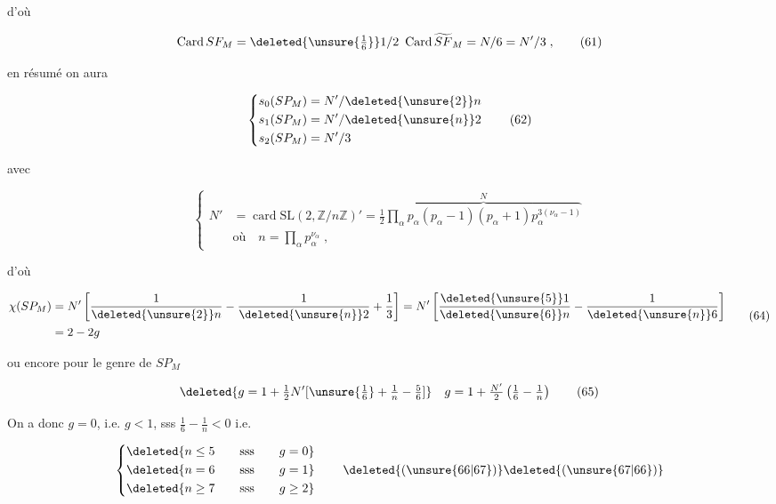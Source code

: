 d'où

\[
\operatorname{Card}SF_M=\deleted{\unsure{\tfrac16}}1/2\ \operatorname{Card}\widetilde{SF}_M=N/6=N'/3\;,\tag*{(61)}
\]

en résumé on aura

\[
\left\{\begin{aligned}
s_0(SP_M)&=N'/\deleted{\unsure{2}}n\\
s_1(SP_M)&=N'/\deleted{\unsure{n}}2\\
s_2(SP_M)&=N'/3
\end{aligned}\right.\tag*{(62)}
\]


avec

\[
\left\{\begin{aligned}
N'&=\operatorname{card}\mathrm{SL}(2,\mathbb{Z}/n\mathbb{Z})'=\tfrac12\overbrace{\prod_\alpha p_\alpha(p_\alpha-1)(p_\alpha+1)p_\alpha^{3(\nu_\alpha-1)}}^N\\
&\text{où}\quad n=\prod_\alpha p_\alpha^{\nu_\alpha}\;,
\end{aligned}\right.\tag*{(63)}
\]

d'où

\[
\begin{aligned}
\chi(SP_M)&=N'\left[\frac1{\deleted{\unsure{2}}n}-\frac1{\deleted{\unsure{n}}2}+\frac13\right]=N'\left[\frac{\deleted{\unsure{5}}1}{\deleted{\unsure{6}}n}-\frac1{\deleted{\unsure{n}}6}\right]\\
&=2-2g
\end{aligned}\tag*{(64)}
\]

ou encore pour le genre de $SP_M$

\[
\deleted{g=1+\tfrac12N'[\unsure{\tfrac16}+\tfrac1n-\tfrac56]}\quad
g=1+\tfrac{N'}2\left(\tfrac16-\tfrac1n\right)\tag*{(65)}
\]

On a donc $g=0$, i.e. $g<1$, sss   $\frac16-\frac1n<0$ i.e. 

\[
\left\{\begin{aligned}
&\deleted{n\leq5\qquad\text{sss}\qquad g=0}\\
&\deleted{n=6\qquad\text{sss}\qquad g=1}\\
&\deleted{n\geq7\qquad\text{sss}\qquad g\geq2}
\end{aligned}\right.\tag*{\deleted{(\unsure{66|67})}\deleted{(\unsure{67|66})}}
\]


